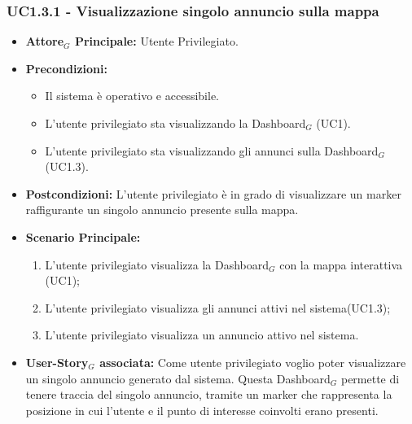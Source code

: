 \documentclass[11pt]{article}
\begin{document}
\begin{justify}
\subsubsection{\textbf{UC1.3.1 - Visualizzazione singolo annuncio sulla mappa}}
\label{UC1.3.1}
\begin{itemize}
     \item \textbf{Attore$_G$ Principale:} Utente Privilegiato.
     \item \textbf{Precondizioni:}
        \begin{itemize}
        \item Il sistema è operativo e accessibile.
    	\item L'utente privilegiato sta visualizzando la Dashboard$_G$ (UC1).
    	\item L'utente privilegiato sta visualizzando gli annunci sulla Dashboard$_G$ (UC1.3).
        \end{itemize}
     \item \textbf{Postcondizioni:} L'utente privilegiato è in grado di visualizzare un marker raffigurante un singolo annuncio presente sulla mappa.
     \item \textbf{Scenario Principale:}
        \begin{enumerate}
            \item L'utente privilegiato visualizza la Dashboard$_G$ con la mappa interattiva (UC1);
            \item L'utente privilegiato visualizza gli annunci attivi nel sistema(UC1.3);
            \item L'utente privilegiato visualizza un annuncio attivo nel sistema.
        \end{enumerate}
     \item \textbf{User-Story$_G$ associata:}
     Come utente privilegiato voglio poter visualizzare un singolo annuncio generato dal sistema. Questa Dashboard$_G$ permette di tenere traccia del singolo annuncio, tramite un marker che rappresenta la posizione in cui l'utente e il punto di interesse coinvolti erano presenti.
\end{itemize}

\end{justify}
\end{document}
